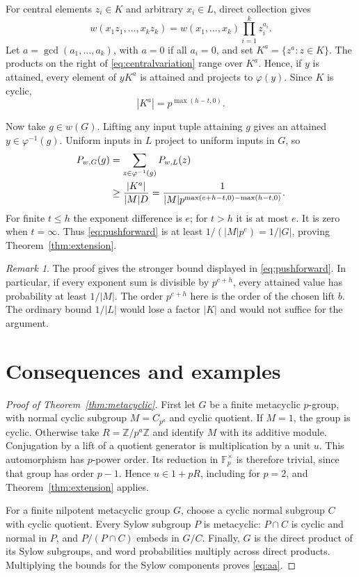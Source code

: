 \documentclass[11pt]{article}
\theoremstyle{remark}\newtheorem{remark}[theorem]{Remark}
\newcommand{\F}{\mathbb F}
\newcommand{\Z}{\mathbb Z}
\begin{document}
For central elements $z_i\in K$ and arbitrary $x_i\in L$, direct collection gives
\begin{equation}\label{eq:centralvariation}
 w(x_1z_1,\ldots,x_kz_k)=w(x_1,\ldots,x_k)\prod_{i=1}^kz_i^{a_i}.
\end{equation}
Let $a=\gcd(a_1,\ldots,a_k)$, with $a=0$ if all $a_i=0$, and set $K^a=\{z^a:z\in K\}$. The products on the right of \eqref{eq:centralvariation} range over $K^a$. Hence, if $y$ is attained, every element of $yK^a$ is attained and projects to $\varphi(y)$. Since $K$ is cyclic,
\begin{equation}\label{eq:powerimage}
 |K^a|=p^{\max(h-t,0)}.
\end{equation}

Now take $g\in w(G)$. Lifting any input tuple attaining $g$ gives an attained $y\in\varphi^{-1}(g)$. Uniform inputs in $L$ project to uniform inputs in $G$, so
\begin{align}
 P_{w,G}(g)
 &=\sum_{z\in\varphi^{-1}(g)}P_{w,L}(z)\notag\\
 &\ge\frac{|K^a|}{|M|D}
 =\frac{1}{|M|p^{\max(e+h-t,0)-\max(h-t,0)}}.
 \label{eq:pushforward}
\end{align}
For finite $t\le h$ the exponent difference is $e$; for $t>h$ it is at most $e$. It is zero when $t=\infty$. Thus \eqref{eq:pushforward} is at least $1/(|M|p^e)=1/|G|$, proving Theorem~\ref{thm:extension}.

\begin{remark}
The proof gives the stronger bound displayed in \eqref{eq:pushforward}. In particular, if every exponent sum is divisible by $p^{e+h}$, every attained value has probability at least $1/|M|$. The order $p^{e+h}$ here is the order of the chosen lift $b$. The ordinary bound $1/|L|$ would lose a factor $|K|$ and would not suffice for the argument.
\end{remark}

\section{Consequences and examples}\label{sec:examples}
\begin{proof}[Proof of Theorem~\ref{thm:metacyclic}]
First let $G$ be a finite metacyclic $p$-group, with normal cyclic subgroup $M=C_{p^a}$ and cyclic quotient. If $M=1$, the group is cyclic. Otherwise take $R=\Z/p^a\Z$ and identify $M$ with its additive module. Conjugation by a lift of a quotient generator is multiplication by a unit $u$. This automorphism has $p$-power order. Its reduction in $\F_p^\times$ is therefore trivial, since that group has order $p-1$. Hence $u\in1+pR$, including for $p=2$, and Theorem~\ref{thm:extension} applies.

For a finite nilpotent metacyclic group $G$, choose a cyclic normal subgroup $C$ with cyclic quotient. Every Sylow subgroup $P$ is metacyclic: $P\cap C$ is cyclic and normal in $P$, and $P/(P\cap C)$ embeds in $G/C$. Finally, $G$ is the direct product of its Sylow subgroups, and word probabilities multiply across direct products. Multiplying the bounds for the Sylow components proves \eqref{eq:aa}.
\end{proof}
\end{document}
